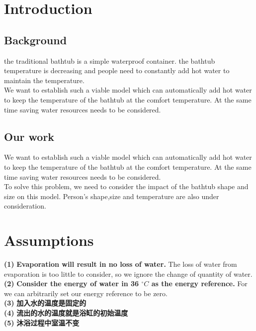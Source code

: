 \documentclass{mcmthesis}
\begin{document}
\setcounter{page}{1}
\section{Introduction}
\subsection{Background}%
\indent the traditional bathtub is a simple waterproof container.
the bathtub temperature is decreasing and people need to constantly add hot water to maintain the temperature.\\
\indent We want to establish such a viable model which can automatically add hot water to keep the temperature of the bathtub at the comfort temperature. At the same time saving water resources needs to be considered.
\subsection{Our work}

\indent We want to establish such a viable model which can automatically add hot water to keep the temperature of the bathtub at the comfort temperature. At the same time saving water resources needs to be considered.\\
\indent To solve this problem, we need to consider the impact of the bathtub shape and size on this model. Person's shape,size and temperature are also under consideration.

\section{Assumptions}
\noindent
{\bf (1) } \textbf{Evaporation will result in no loss of water.} The loss of water from evaporation is too little to consider, so we ignore the change of quantity of water.\\
{\bf (2) } \textbf{Consider the energy of water in 36 ${^\circ}C$ as the energy reference.} For we can arbitrarily set our energy reference to be zero.\\
{\bf (3) } \textbf{加入水的温度是固定的} \\
{\bf (4) } \textbf{流出的水的温度就是浴缸的初始温度} \\
{\bf (5) } \textbf{沐浴过程中室温不变} \\
\end{document}
